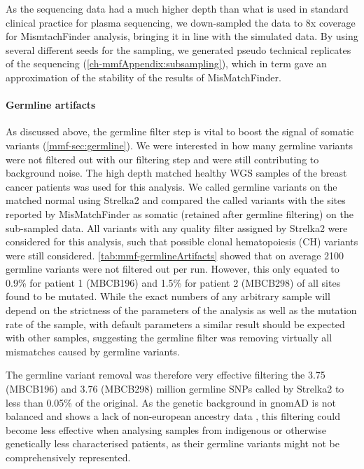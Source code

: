 As the sequencing data had a much higher depth than what is used in standard clinical practice for plasma sequencing, we down-sampled the data to 8x coverage for MismtachFinder analysis, bringing it in line with the simulated data. By using several different seeds for the sampling, we generated pseudo technical replicates of the sequencing (\autoref{ch-mmfAppendix:subsampling}), which in term gave an approximation of the stability of the results of MisMatchFinder.


\paragraph{Germline artifacts}
\label{mmf-sec:germlineArtifacts}
As discussed above, the germline filter step is vital to boost the signal of somatic variants (\autoref{mmf-sec:germline}). We were interested in how many germline variants were not filtered out with our filtering step and were still contributing to background noise. The high depth matched healthy WGS samples of the breast cancer patients was used for this analysis. We called germline variants on the matched normal using Strelka2 and compared the called variants with the sites reported by MisMatchFinder as somatic (retained after germline filtering) on the sub-sampled data. All variants with any quality filter assigned by Strelka2 were considered for this analysis, such that possible clonal hematopoiesis (CH) variants were still considered. \autoref{tab:mmf-germlineArtifacts} showed that on average 2100 germline variants were not filtered out per run. However, this only equated to 0.9\% for patient 1 (MBCB196) and 1.5\% for patient 2 (MBCB298) of all sites found to be mutated. While the exact numbers of any arbitrary sample will depend on the strictness of the parameters of the analysis as well as the mutation rate of the sample, with default parameters a similar result should be expected with other samples, suggesting the germline filter was removing virtually all mismatches caused by germline variants.

The germline variant removal was therefore very effective filtering the 3.75 (MBCB196) and 3.76 (MBCB298) million germline SNPs called by Strelka2 to less than 0.05\% of the original. As the genetic background in gnomAD is not balanced and shows a lack of non-european ancestry data \cite{Tiao2020}, this filtering could become less effective when analysing samples from indigenous or otherwise genetically less characterised patients, as their germline variants might not be comprehensively represented.

